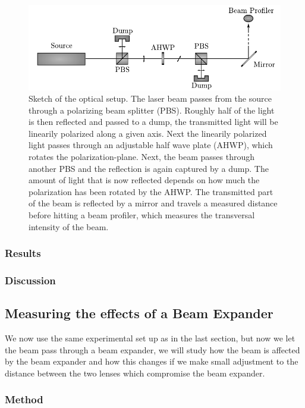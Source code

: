 \documentclass[a4paper, 11pt, notitlepage, english]{article}
\begin{document}
\begin{figure}[p]
\includegraphics[width=\textwidth]{oppsett1}	
\caption{Sketch of the optical setup. The laser beam passes from the source through a polarizing beam splitter (PBS). Roughly half of the light is then reflected and passed to a dump, the transmitted light will be linearily polarized along a given axis. Next the linearily polarized light passes through an adjustable half wave plate (AHWP), which rotates the polarization-plane. Next, the beam passes through another PBS and the reflection is again captured by a dump. The amount of light that is now reflected depends on how much the polarization has been rotated by the AHWP. The transmitted part of the beam is reflected by a mirror and travels a measured distance before hitting a beam profiler, which measures the transversal intensity of the beam. \label{fig:setup_sketch}}
\end{figure}

\clearpage

\subsubsection{Results}
\subsubsection{Discussion}

\subsection{Measuring the effects of a Beam Expander}

We now use the same experimental set up as in the last section, but now we let the beam pass through a beam expander, we will study how the beam is affected by the beam expander and how this changes if we make small adjustment to the distance between the two lenses which compromise the beam expander.

\subsubsection{Method}
\end{document}
